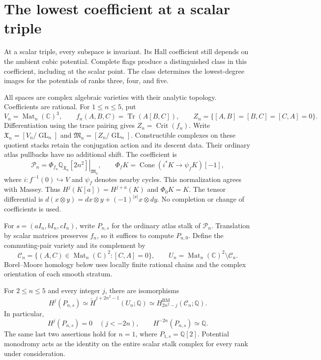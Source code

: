 \section{The lowest coefficient at a scalar triple}
\label{sch:sec:scalar}

At a scalar triple, every subspace is invariant. Its Hall coefficient
still depends on the ambient cubic potential. Complete flags produce
a distinguished class in this coefficient, including at the scalar point.
The class determines the lowest-degree images for the potentials of
ranks three, four, and five.

All spaces are complex algebraic varieties with their analytic topology.
Coefficients are rational. For $1\leq n\leq5$, put
\[
 V_n=\operatorname{Mat}_n(\mathbb C)^3,\qquad
 f_n(A,B,C)=\operatorname{Tr}(A[B,C]),\qquad
 Z_n=\{[A,B]=[B,C]=[C,A]=0\}.
\]
Differentiation using the trace pairing gives $Z_n=\operatorname{Crit}(f_n)$.
Write $\mathfrak X_n=[V_n/\operatorname{GL}_n]$ and
$\mathfrak M_n=[Z_n/\operatorname{GL}_n]$. Constructible complexes on
these quotient stacks retain the conjugation action and its descent data.
Their ordinary atlas pullbacks have no additional shift. The coefficient is
\[
 \mathcal P_n=
 \left.\Phi_{f_n}\mathbb Q_{\mathfrak X_n}[2n^2]\right|_{\mathfrak M_n},
 \qquad
 \Phi_fK=\operatorname{Cone}(i^*K\longrightarrow\psi_fK)[-1],
\]
where $i:f^{-1}(0)\hookrightarrow V$ and $\psi_f$ denotes nearby cycles.
This normalization agrees with Massey\cite[pp.~1--2]{schMasseyST}.
Thus $H^j(K[a])=H^{j+a}(K)$ and $\Phi_0K=K$.
The tensor differential is
$d(x\otimes y)=dx\otimes y+(-1)^{|x|}x\otimes dy$.
No completion or change of coefficients is used.

For $s=(aI_n,bI_n,cI_n)$, write $P_{n,s}$ for the ordinary atlas
stalk of $\mathcal P_n$. Translation by scalar matrices preserves $f_n$,
so it suffices to compute $P_{n,0}$.
Define the commuting-pair variety and its complement by
\[
 \mathcal C_n=\{(A,C)\in\operatorname{Mat}_n(\mathbb C)^2:[C,A]=0\},
 \qquad U_n=\operatorname{Mat}_n(\mathbb C)^2\setminus\mathcal C_n.
\]
Borel--Moore homology below uses locally finite rational chains and
the complex orientation of each smooth stratum.

\begin{proposition}
\label{sch:prop:scalar}
For $2\leq n\leq5$ and every integer $j$, there are isomorphisms
\begin{equation}
 H^j(P_{n,s})\simeq
 \widetilde H^{j+2n^2-1}(U_n;\mathbb Q)
 \simeq H^{\mathrm{BM}}_{2n^2-j}(\mathcal C_n;\mathbb Q).
 \label{sch:eq:scalar-bm}
\end{equation}
In particular,
\[
 H^j(P_{n,s})=0\quad(j<-2n),\qquad
 H^{-2n}(P_{n,s})\simeq\mathbb Q.
\]
The same last two assertions hold for $n=1$, where
$P_{1,s}=\mathbb Q[2]$. Potential monodromy acts as the identity on
the entire scalar stalk complex for every rank under consideration.
\end{proposition}

